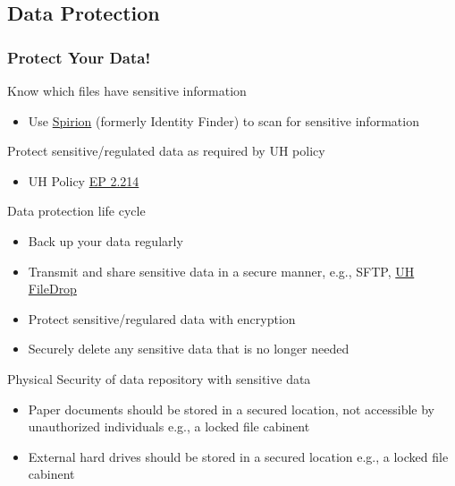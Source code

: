 \subsection{Data Protection}
\begin{frame}
  \frametitle{Protect Your Data!}
  \vspace{-10pt}
  \begin{block}{Know which files have sensitive information}
    \begin{itemize}
    \item Use \href{http://www.hawaii.edu/askus/1297}{Spirion} (formerly Identity Finder) to scan for sensitive information
    \end{itemize}
  \end{block}
  \vspace{-3pt}  
  \begin{block}{Protect sensitive/regulated data as required by UH policy}
  \begin{itemize}
  \item UH Policy \href{https://www.hawaii.edu/policy/EP2.214}{EP 2.214}
  \end{itemize}
  \end{block}
  \vspace{-3pt}  
  \begin{block}{Data protection life cycle}
    \begin{itemize}
    \item Back up your data regularly
    \item Transmit and share sensitive data in a secure manner, e.g., SFTP, \href{https://www.hawaii.edu/filedrop/}{UH FileDrop}
    \item Protect sensitive/regulared data with encryption
    \item Securely delete any sensitive data that is no longer needed
    \end{itemize}
  \end{block}    
  \vspace{-3pt}  
  \begin{block}{Physical Security of data repository with sensitive data}
    \begin{itemize}
    \item Paper documents should be stored in a secured location, not accessible by unauthorized individuals e.g., a locked file cabinent
    \item External hard drives should be stored in a secured location e.g., a locked file cabinent
    \end{itemize}
  \end{block}    
\end{frame}  


